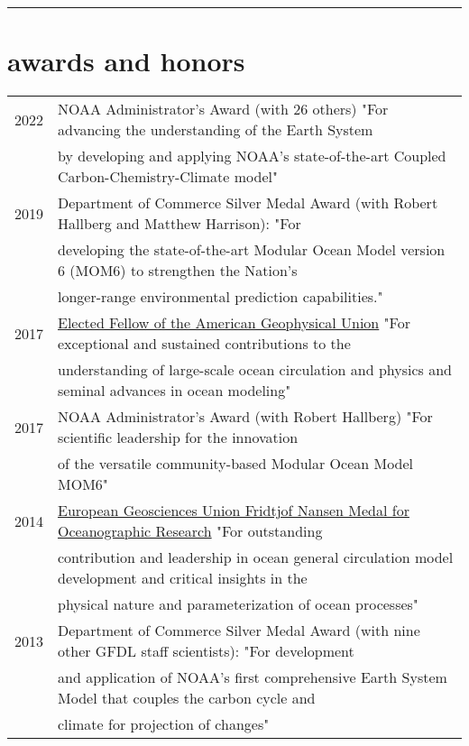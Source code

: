 \documentclass{article}
\begin{document}
\noindent\rule{\textwidth}{1pt}
\vspace{-1cm}
\section*{\sc  \color{Maroon}   awards and honors}
\vspace{-.25cm}

\begin{tabular}{ll}
  2022 & NOAA Administrator's Award (with 26 others) "For advancing the understanding of the Earth System \\ & by developing and applying NOAA's state-of-the-art Coupled Carbon-Chemistry-Climate model"
  \\
  2019 & Department of Commerce Silver Medal Award (with Robert Hallberg and Matthew Harrison): "For \\ &  developing the state-of-the-art Modular Ocean Model version 6 (MOM6) to strengthen the Nation's \\& longer-range environmental prediction capabilities."
  \\
  2017 & \href{https://eos.org/agu-news/celebrating-the-2017-class-of-fellows}{Elected Fellow of the American Geophysical Union} "For exceptional and sustained contributions to the \\ &  understanding of large-scale ocean circulation and physics and seminal advances in ocean modeling"
\\
  2017 & NOAA Administrator's Award (with Robert Hallberg) "For scientific leadership for the innovation \\ & of the versatile  community-based Modular Ocean Model MOM6" 
  \\
  2014 & \href{http://www.egu.eu/awards-medals/fridtjof-nansen/2014/stephen-m-griffies/}{European Geosciences Union Fridtjof Nansen Medal for
         Oceanographic Research}  "For 
outstanding \\ & contribution and leadership in 
ocean general circulation model development 
and critical insights in the \\ & physical 
nature and parameterization of ocean processes"
\\
  2013 & Department of Commerce Silver Medal Award (with nine other
  GFDL staff scientists): 
  "For development \\ & and application of NOAA's first comprehensive  
  Earth System Model  
  that couples the carbon cycle and \\ & climate for projection of changes" \\

\end{tabular}
\end{document}
